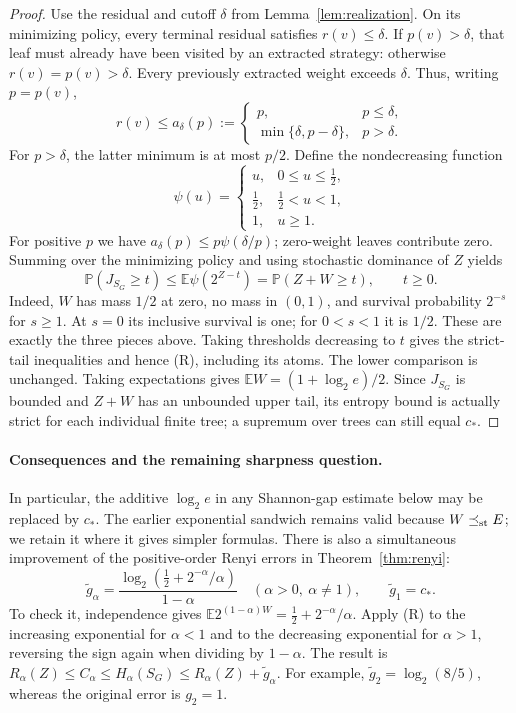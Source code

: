 \documentclass[11pt,a4paper]{article}
\newcommand{\E}{\mathbb E}
\newcommand{\Prob}{\mathbb P}
\begin{document}
\begin{proof}
Use the residual and cutoff $\delta$ from Lemma~\ref{lem:realization}.
On its minimizing policy, every terminal residual satisfies
$r(v)\le\delta$. If $p(v)>\delta$, that leaf must already have been
visited by an extracted strategy: otherwise $r(v)=p(v)>\delta$.
Every previously extracted weight exceeds $\delta$. Thus, writing $p=p(v)$,
\[
r(v)\le a_\delta(p):=
\begin{cases}
p,&p\le\delta,\\
\min\{\delta,p-\delta\},&p>\delta.
\end{cases}
\]
For $p>\delta$, the latter minimum is at most $p/2$. Define the
nondecreasing function
\[
\psi(u)=
\begin{cases}
u,&0\le u\le\tfrac12,\\
\tfrac12,&\tfrac12<u<1,\\
1,&u\ge1.
\end{cases}
\]
For positive $p$ we have $a_\delta(p)\le p\psi(\delta/p)$;
zero-weight leaves contribute zero. Summing over the minimizing policy
and using stochastic dominance of $Z$ yields
\[
\Prob(J_{S_G}\ge t)
\le\E\psi(2^{Z-t})=\Prob(Z+W\ge t),\qquad t\ge0.
\]
Indeed, $W$ has mass $1/2$ at zero, no mass in $(0,1)$, and survival
probability $2^{-s}$ for $s\ge1$. At $s=0$ its inclusive survival is one;
for $0<s<1$ it is $1/2$. These are exactly the three pieces above.
Taking thresholds decreasing to $t$ gives the strict-tail inequalities
and hence (R), including its atoms. The lower comparison is unchanged.
Taking expectations gives $\E W=(1+\log_2e)/2$. Since $J_{S_G}$ is
bounded and $Z+W$ has an unbounded upper tail, its entropy bound is
actually strict for each individual finite tree; a supremum over trees
can still equal $c_*$.
\end{proof}

\paragraph{Consequences and the remaining sharpness question.}
In particular, the additive $\log_2e$ in any Shannon-gap estimate below
may be replaced by $c_*$. The earlier exponential sandwich remains valid
because $W\preceq_{\rm st}E$; we retain it where it gives simpler formulas.
There is also a simultaneous improvement of the positive-order Renyi
errors in Theorem~\ref{thm:renyi}:
\[
\widetilde g_\alpha=
\frac{\log_2(\tfrac12+2^{-\alpha}/\alpha)}{1-\alpha}
\quad(\alpha>0,\ \alpha\ne1),\qquad
\widetilde g_1=c_*.
\]
To check it, independence gives
$\E2^{(1-\alpha)W}=\tfrac12+2^{-\alpha}/\alpha$.
Apply (R) to the increasing exponential for $\alpha<1$ and to the
decreasing exponential for $\alpha>1$, reversing the sign again when
dividing by $1-\alpha$. The result is
$R_\alpha(Z)\le C_\alpha\le H_\alpha(S_G)
\le R_\alpha(Z)+\widetilde g_\alpha$.
For example, $\widetilde g_2=\log_2(8/5)$, whereas the original error is
$g_2=1$.
\end{document}
